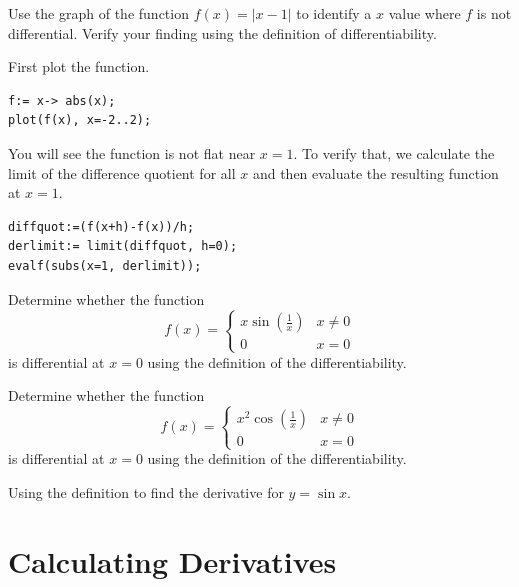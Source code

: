 \documentclass[en,11pt,simple]{elegantbook}
\let\BeginKnitrBlock\begin \let\EndKnitrBlock\end
\begin{document}
\BeginKnitrBlock{example}{}{}
\protect\hypertarget{exm:unnamed-chunk-44}{}{\label{exm:unnamed-chunk-44} }
Use the graph of the function \(f(x)=|x-1|\) to identify a \(x\) value where \(f\) is not differential. Verify your finding using the definition of differentiability.
\EndKnitrBlock{example}

\BeginKnitrBlock{solution}{}{}
{}
First plot the function.

\begin{verbatim}
f:= x-> abs(x);
plot(f(x), x=-2..2);
\end{verbatim}

You will see the function is not flat near \(x=1\). To verify that, we calculate the limit of the difference quotient for all \(x\) and then evaluate the resulting function at \(x=1\).

\begin{verbatim}
diffquot:=(f(x+h)-f(x))/h;
derlimit:= limit(diffquot, h=0);
evalf(subs(x=1, derlimit));
\end{verbatim}
\EndKnitrBlock{solution}

\BeginKnitrBlock{exercise}{}{}
\protect\hypertarget{exr:unnamed-chunk-46}{}{\label{exr:unnamed-chunk-46} }
Determine whether the function
\[
f(x)=\begin{cases}
x\sin\left(\frac1x\right) & x\neq 0\\
0 & x=0
\end{cases}
\]
is differential at \(x=0\) using the definition of the differentiability.
\EndKnitrBlock{exercise}

\BeginKnitrBlock{exercise}{}{}
\protect\hypertarget{exr:unnamed-chunk-47}{}{\label{exr:unnamed-chunk-47} }
Determine whether the function
\[
f(x)=\begin{cases}
x^2\cos\left(\frac1x\right) & x\neq 0\\
0 & x=0
\end{cases}
\]
is differential at \(x=0\) using the definition of the differentiability.
\EndKnitrBlock{exercise}

\BeginKnitrBlock{exercise}{}{}
\protect\hypertarget{exr:unnamed-chunk-48}{}{\label{exr:unnamed-chunk-48} }
Using the definition to find the derivative for \(y=\sin x\).
\EndKnitrBlock{exercise}

\hypertarget{calculating-derivatives}{%
\section{Calculating Derivatives}\label{calculating-derivatives}}
\end{document}
